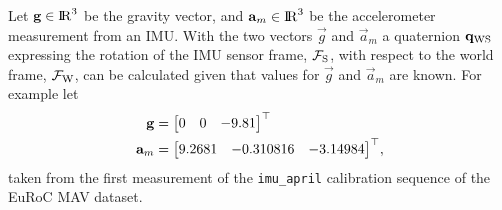 Let ${\mathbf{g}} \in {\rm I\!R}^{3}$ be the gravity vector, and ${\mathbf{a}}_{m} \in
{\rm I\!R}^{3}$ be the accelerometer measurement from an IMU. With the two vectors
$\Vec{g}$ and $\Vec{a}_{m}$ a quaternion ${{\mathbf{q}}}_{{\text{W}}{\text{S}}}$ expressing the
rotation of the IMU sensor frame, $\mathcal{F}_{{\text{S}}}$, with respect to the world
frame, $\mathcal{F}_{{\text{W}}}$, can be calculated given that values for $\Vec{g}$ and
$\Vec{a}_{m}$ are known. For example let
%
\begin{align}
  {\mathbf{g}} &= {{\begin{bmatrix} 0 & 0 & -9.81 \end{bmatrix}^{\top}}} \\
  {\mathbf{a}}_{m} &= {{
    \begin{bmatrix}
      9.2681 &
      -0.310816 &
      -3.14984
    \end{bmatrix}
  ^{\top}}} ,
\end{align}
%
taken from the first measurement of the \texttt{imu\_april} calibration
sequence of the EuRoC MAV dataset.

